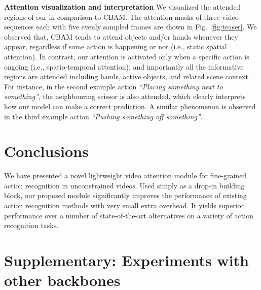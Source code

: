 \documentclass[runningheads]{llncs}
\newcommand{\keypoint}[1]{\vspace{0.1cm}\noindent\textbf{#1}\quad}
\begin{document}
\keypoint{Attention visualization and interpretation}
We visualized the attended regions of our \shortname{} in comparison to CBAM.
The attention masks of three video sequences each with five evenly sampled frames are shown in Fig.~\ref{fig:teaser}.
We observed that,
CBAM tends to attend objects and/or hands whenever 
they appear, regardless if some action is happening or not
(i.e., static spatial attention).
In contrast, our \shortname{} attention is activated only when
a specific action is ongoing (i.e., spatio-temporal attention), and importantly 
all the informative regions are attended including 
hands, active objects, and related scene context.
For instance, in the second example action 
{\em ``Placing something next to something''},
the neighbouring scissor is also attended,
which clearly interprets how our model can make a correct prediction.
A similar phenomenon is observed in the third example 
action {\em ``Pushing something off something''}.







\section{Conclusions}
We have presented a novel lightweight video attention module
for fine-grained action recognition in unconstrained videos.
Used simply as a drop-in building block,
our proposed \shortname{} module significantly improves the
performance of existing action recognition methods
with very small extra overhead.
It yields superior performance over a number of state-of-the-art 
alternatives on a variety of action recognition tasks.





\clearpage



\newpage
\section{Supplementary: Experiments with other backbones}
\end{document}
